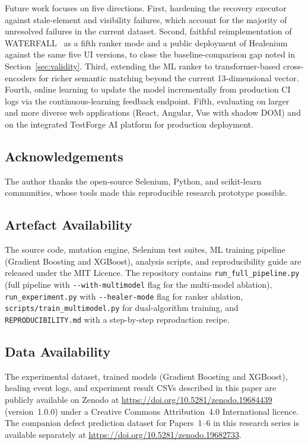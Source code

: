 \documentclass[conference]{IEEEtran}
\begin{document}
Future work focuses on five directions. First, hardening the recovery executor against stale-element and visibility failures, which account for the majority of unresolved failures in the current dataset. Second, faithful reimplementation of WATERFALL~\cite{hammoudi2016} as a fifth ranker mode and a public deployment of Healenium against the same five UI versions, to close the baseline-comparison gap noted in Section~\ref{sec:validity}. Third, extending the ML ranker to transformer-based cross-encoders for richer semantic matching beyond the current 13-dimensional vector. Fourth, online learning to update the model incrementally from production CI logs via the continuous-learning feedback endpoint. Fifth, evaluating on larger and more diverse web applications (React, Angular, Vue with shadow DOM) and on the integrated TestForge AI platform for production deployment.

\subsection*{Acknowledgements}
The author thanks the open-source Selenium, Python, and scikit-learn communities, whose tools made this reproducible research prototype possible.

\subsection*{Artefact Availability}
The source code, mutation engine, Selenium test suites, ML training pipeline (Gradient Boosting and XGBoost), analysis scripts, and reproducibility guide are released under the MIT Licence. The repository contains \texttt{run\_full\_pipeline.py} (full pipeline with \texttt{-{}-with-multimodel} flag for the multi-model ablation), \texttt{run\_experiment.py} with \texttt{-{}-healer-mode} flag for ranker ablation, \texttt{scripts/train\_multimodel.py} for dual-algorithm training, and \texttt{REPRODUCIBILITY.md} with a step-by-step reproduction recipe.

\subsection*{Data Availability}
The experimental dataset, trained models (Gradient Boosting and XGBoost), healing event logs, and experiment result CSVs described in this paper are publicly available on Zenodo at \url{https://doi.org/10.5281/zenodo.19684439} (version~1.0.0) under a Creative Commons Attribution~4.0 International licence. The companion defect prediction dataset for Papers~1--6 in this research series is available separately at \url{https://doi.org/10.5281/zenodo.19682733}.
\end{document}
